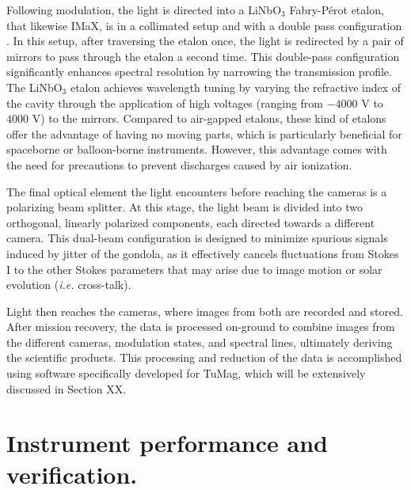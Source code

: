 Following modulation, the light is directed into a LiNbO$_3$ Fabry-Pérot etalon, that likewise IMaX, is in a collimated setup and with a double pass configuration \citep{etalon-doublepass}. In this setup, after traversing the etalon once, the light is redirected by a pair of mirrors to pass through the etalon a second time. This double-pass configuration significantly enhances spectral resolution by narrowing the transmission profile. The LiNbO$_3$ etalon achieves wavelength tuning by varying the refractive index of the cavity through the application of high voltages (ranging from $-4000$ V to $4000$ V) to the mirrors. Compared to air-gapped etalons, these kind of etalons offer the advantage of having no moving parts, which is particularly beneficial for spaceborne or balloon-borne instruments. However, this advantage comes with the need for precautions to prevent discharges caused by air ionization.

The final optical element the light encounters before reaching the cameras is a polarizing beam splitter. At this stage, the light beam is divided into two orthogonal, linearly polarized components, each directed towards a different camera. This dual-beam configuration \citep{lites-doublebeam} is designed to minimize spurious signals induced by jitter of the gondola, as it effectively cancels fluctuations from Stokes I to the other Stokes parameters that may arise due to image motion or solar evolution (\textit{i.e.} cross-talk).

Light then reaches the cameras, where images from both are recorded and stored. After mission recovery, the data is processed on-ground to combine images from the different cameras, modulation states, and spectral lines, ultimately deriving the scientific products. This processing and reduction of the data is accomplished using software specifically developed for TuMag, which will be extensively discussed in Section XX. 

\section{Instrument performance and verification.}

